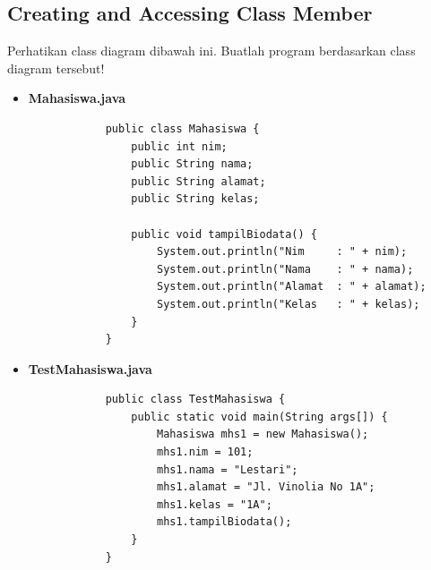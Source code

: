 \documentclass[12pt,titlepage]{article}
\begin{document}
\pagebreak

\subsection{Creating and Accessing Class Member}

Perhatikan class diagram dibawah ini. Buatlah program berdasarkan class diagram
tersebut!

\vspace{5mm}


\begin{itemize}
    \item {
        \textbf{Mahasiswa.java}

        \begin{verbatim}
            public class Mahasiswa {
                public int nim;
                public String nama;
                public String alamat;
                public String kelas;
            
                public void tampilBiodata() {
                    System.out.println("Nim     : " + nim);
                    System.out.println("Nama    : " + nama);
                    System.out.println("Alamat  : " + alamat);
                    System.out.println("Kelas   : " + kelas);
                }
            }
        \end{verbatim}
    }
    \item {
        \textbf{TestMahasiswa.java}

        \begin{verbatim}
            public class TestMahasiswa {
                public static void main(String args[]) {
                    Mahasiswa mhs1 = new Mahasiswa();
                    mhs1.nim = 101;
                    mhs1.nama = "Lestari";
                    mhs1.alamat = "Jl. Vinolia No 1A";
                    mhs1.kelas = "1A";
                    mhs1.tampilBiodata();
                }
            }
        \end{verbatim}
    }
\end{itemize}
\end{document}
